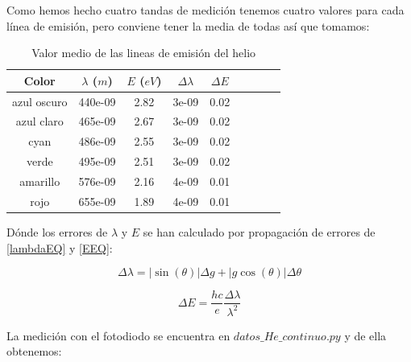 \documentclass[11pt, a4paper, twocolumn]{article}
\begin{document}
\newpage
\quad
\newpage

Como hemos hecho cuatro tandas de medición tenemos cuatro valores para cada 
línea de emisión, pero conviene tener la media de todas así que tomamos:


\begin{table}[h]
   \centering

\begin{tabular}{ccccccccc}
\hline
   Color       &  $\lambda$ ($m$) &    $E$ ($eV$) &  $\Delta \lambda$ &     $\Delta E$ \\
\hline
           azul oscuro & 440e-09 &   2.82 &3e-09 &   0.02 \\
           azul claro  & 465e-09 &   2.67 &3e-09 &   0.02 \\
           cyan        & 486e-09 &   2.55 &3e-09 &   0.02 \\
           verde       & 495e-09 &   2.51 &3e-09 &   0.02 \\
           amarillo    & 576e-09 &   2.16 &4e-09 &   0.01 \\
           rojo        & 655e-09 &   1.89 &4e-09 &   0.01 \\
\hline


\end{tabular}
\caption{Valor medio de las lineas de emisión del helio}
\label{tab: TablaHeM}

\end{table}

Dónde los errores de $\lambda$ y $E$ se han calculado por propagación de 
errores de \ref{lambdaEQ} y \ref{EEQ}:

\begin{equation}
   \Delta \lambda = \left| \sin(\theta)\right| \Delta g + |g\cos(\theta)|\Delta \theta
\end{equation}

\begin{equation}
   \Delta E = \frac{hc}{e} \frac{\Delta \lambda}{\lambda^2}
\end{equation}

La medición con el fotodiodo se encuentra en $datos\_He\_continuo.py$ y de ella obtenemos:
\end{document}
